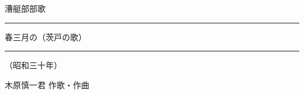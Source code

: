 \documentclass[10pt,b5j]{tarticle} %
\begin{document}
\begin{minipage}[c]{0.7\hsize} %
    \begin{center}
        {\LARGE
            漕艇部部歌 %
        }
        {\large 
            \rule[0.0em]{1.0em}{0.05em} 春三月の（茨戸の歌） \rule[0.0em]{1.0em}{0.05em}
        }
        {\small 
            （昭和三十年） %
        }
    \end{center}
\end{minipage}
\begin{minipage}[c]{0.3\hsize} %
    \begin{flushright} %
        木原慎一君 作歌・作曲 %
    \end{flushright}
\end{minipage}
\end{document}
